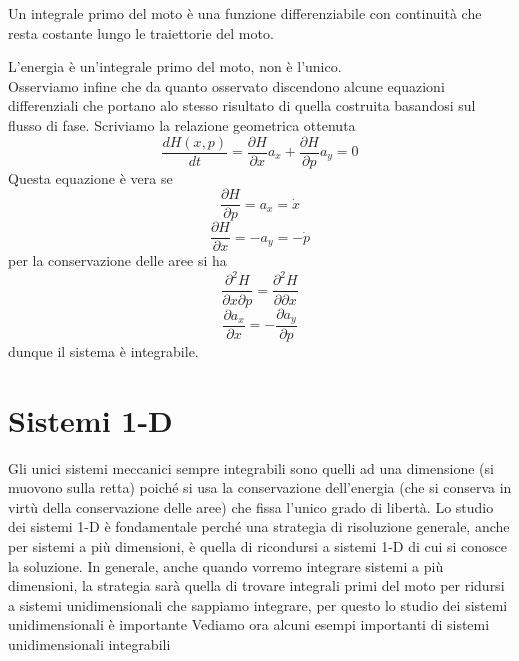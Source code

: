 \documentclass[
10pt, %
a4paper, %
oneside, %
headinclude,footinclude, %
BCOR5mm, %
]{scrartcl}
\begin{document}
	\begin{definizione}
		Un integrale primo del moto è una funzione differenziabile con continuità che resta costante lungo le traiettorie del moto.
	\end{definizione}
	L'energia è un'integrale primo del moto, non è l'unico.\\
	Osserviamo infine che da quanto osservato discendono alcune equazioni differenziali che portano alo stesso risultato di quella costruita basandosi sul flusso di fase. Scriviamo la relazione geometrica ottenuta
	\[\frac{d H(x, p)}{dt} = \frac{\partial H}{\partial x}a_x + \frac{\partial H}{\partial p}a_y = 0\]
	Questa equazione è vera se 
	\[\frac{\partial H}{\partial p} = a_x = \dot{x}\]
	\[\frac{\partial H}{\partial x} = -a_y = -\dot{p}\]
	per la conservazione delle aree si ha
	\[\frac{\partial^2 H}{\partial x \partial p} = \frac{\partial^2 H}{\partial  \partial x}\]
	\[\frac{\partial a_x}{\partial x} = - \frac{\partial a_y}{\partial p}\]
	dunque il sistema è integrabile.
\section{Sistemi 1-D}
Gli unici sistemi meccanici sempre integrabili sono quelli ad una dimensione (si muovono sulla retta) poiché si usa la conservazione dell'energia (che si conserva in virtù della conservazione delle aree) che fissa l'unico grado di libertà. Lo studio dei sistemi 1-D è fondamentale perché una strategia di risoluzione generale, anche per sistemi a più dimensioni, è quella di ricondursi a sistemi 1-D di cui si conosce la soluzione.
In generale, anche quando vorremo integrare sistemi a più dimensioni, la strategia sarà quella di trovare integrali primi del moto per ridursi a sistemi unidimensionali che sappiamo integrare, per questo lo studio dei sistemi unidimensionali è importante Vediamo ora alcuni esempi importanti di sistemi unidimensionali integrabili
\end{document}
